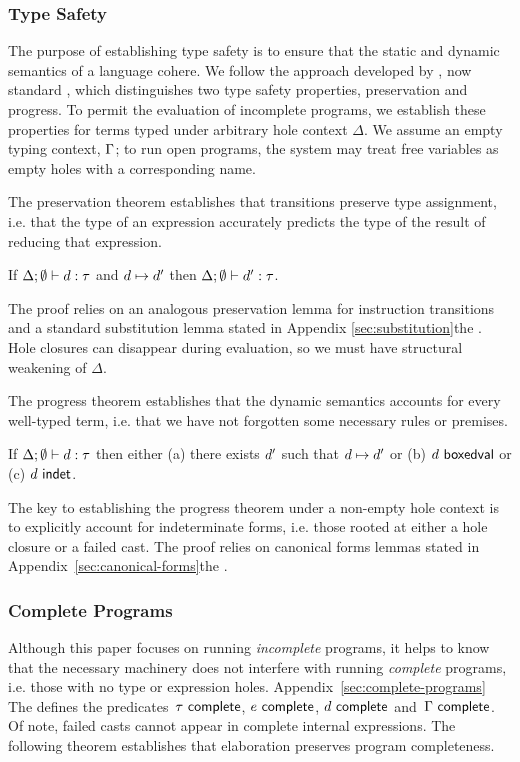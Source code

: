 \subsubsection{Type Safety}
%
The purpose of establishing type safety is to ensure that the static and dynamic semantics of a
language cohere.
%
We follow the approach developed by \citet{wright94:_type_soundness},
now standard \cite{pfpl}, which distinguishes two type safety
properties, preservation and progress.
%
To permit the evaluation of incomplete programs, we establish these
properties for terms typed under arbitrary hole context $\Delta$.
%
We assume an empty typing context, $\Gamma$; to run open programs, the
system may treat free variables as empty holes with a corresponding
name.

The preservation theorem establishes that transitions preserve type
assignment, i.e. that the type of an expression accurately predicts
the type of the result of reducing that expression.

\begin{thm}[Preservation]
  If $\Delta; \emptyset \vdash d : \tau$ and
  $d \mapsto d'$ then
  $\Delta; \emptyset \vdash d' : \tau$.
\end{thm}
\noindent
%
The proof relies on an analogous preservation lemma for instruction
transitions and a standard substitution lemma stated in \ifarxiv Appendix \ref{sec:substitution}\else the \appendixName\fi.
%
Hole closures can disappear during evaluation, so we must have structural weakening 
of $\Delta$.

The progress theorem establishes that the dynamic semantics accounts
for every well-typed term, i.e. that we have not forgotten some
necessary rules or premises.
%
\begin{thm}[Progress]
  If $\Delta; \emptyset \vdash d : \tau$ then either
  (a) there exists $d'$ such that $d \mapsto d'$ or
  (b) $d~\mathsf{boxedval}$ or
  (c) $d~\mathsf{indet}$.
\end{thm}
\noindent
The key to establishing the progress theorem under a non-empty hole
context is to explicitly account for indeterminate forms,
i.e. those rooted at either a hole closure or a failed cast.
%
The proof relies on canonical forms lemmas stated in \ifarxiv Appendix~\ref{sec:canonical-forms}\else the \appendixName\fi.

\subsubsection{Complete Programs}
%
Although this paper focuses on running \emph{incomplete} programs, it helps
to know that the necessary machinery does not interfere with running
\emph{complete} programs, i.e. those with no type or expression holes.
%
\ifarxiv Appendix~\ref{sec:complete-programs} \else The \appendixName{} \fi defines the predicates~$\tau~\mathsf{complete}$,
$e~\mathsf{complete}$, $d~\mathsf{complete}$ and~$\Gamma~\mathsf{complete}$.
%
Of note, failed casts cannot appear in complete internal expressions.
%
The following theorem establishes that elaboration preserves program
completeness.

